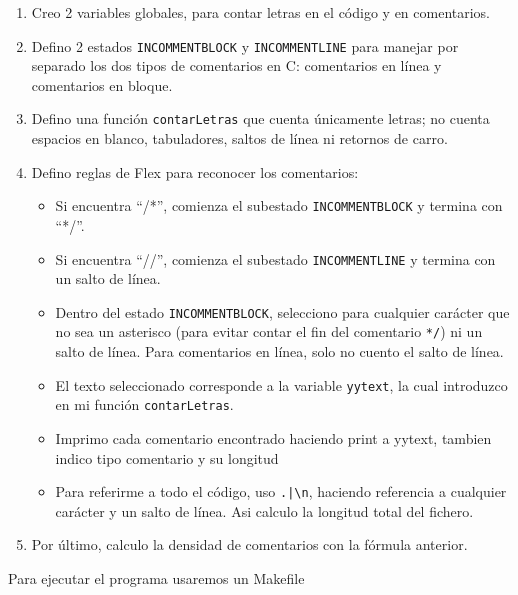 \documentclass{article}
\begin{document}
        \begin{enumerate}
            \item Creo 2 variables globales, para contar letras en el código y en comentarios.
            \item Defino 2 estados \texttt{INCOMMENTBLOCK} y \texttt{INCOMMENTLINE} para manejar por separado los dos tipos de comentarios en C: comentarios en línea y comentarios en bloque.
            \item Defino una función \texttt{contarLetras} que cuenta únicamente letras; no cuenta espacios en blanco, tabuladores, saltos de línea ni retornos de carro.
            \item Defino reglas de Flex para reconocer los comentarios:
                \begin{itemize}
                    \item Si encuentra ``/*'', comienza el subestado \texttt{INCOMMENTBLOCK} y termina con ``*/''.
                    \item Si encuentra ``//'', comienza el subestado \texttt{INCOMMENTLINE} y termina con un salto de línea.
                    \item Dentro del estado \texttt{INCOMMENTBLOCK}, selecciono para cualquier carácter que no sea un asterisco (para evitar contar el fin del comentario \texttt{*/}) ni un salto de línea. Para comentarios en línea, solo no cuento el salto de línea.
                    \item El texto seleccionado corresponde a la variable \texttt{yytext}, la cual introduzco en mi función \texttt{contarLetras}.
                    \item Imprimo cada comentario encontrado haciendo print a yytext, tambien indico tipo comentario y su longitud
                    \item Para referirme a todo el código, uso \texttt{.|\textbackslash n}, haciendo referencia a cualquier carácter y un salto de línea. Asi calculo la longitud total del fichero.

                \end{itemize}
            \item Por último, calculo la densidad de comentarios con la fórmula anterior.
        \end{enumerate}

        \vspace{\baselineskip} %

        Para ejecutar el programa usaremos un Makefile 
\end{document}
